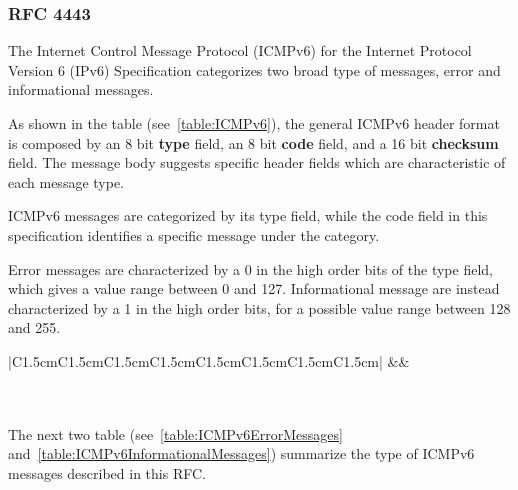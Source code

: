 \documentclass[12pt]{article}
\begin{document}
\subsubsection{RFC 4443}
\label{subsub:4443}

The Internet Control Message Protocol (ICMPv6) for the Internet Protocol Version 6 (IPv6) Specification categorizes two broad type of messages, error and informational messages.

As shown in the table (see~\ref{table:ICMPv6}), the general ICMPv6 header format is composed by an 8 bit \textbf{type} field, an 8 bit \textbf{code} field, and a 16 bit \textbf{checksum} field. The message body suggests specific header fields which are characteristic of each message type.

ICMPv6 messages are categorized by its type field, while the code field in this specification identifies a specific message under the category.

Error messages are characterized by a 0 in the high order bits of the type field, which gives a value range between 0 and 127. Informational message are instead characterized by a 1 in the high order bits, for a possible 
value range between 128 and 255.

\begin{savenotes}
\begin{table}[h]
\centering
\begin{tabular}{|C{1.5cm}C{1.5cm}C{1.5cm}C{1.5cm}C{1.5cm}C{1.5cm}C{1.5cm}C{1.5cm}|}
\hline
{}&&\\
\hline
{}
\\
\\
\hdashline
\end{tabular}
\caption{ICMPv6 General Header Format}
\label{table:ICMPv6}
\end{table}
\end{savenotes}

The next two table (see~\ref{table:ICMPv6ErrorMessages} and~\ref{table:ICMPv6InformationalMessages}) summarize the type of ICMPv6 messages described in this RFC.
\end{document}
